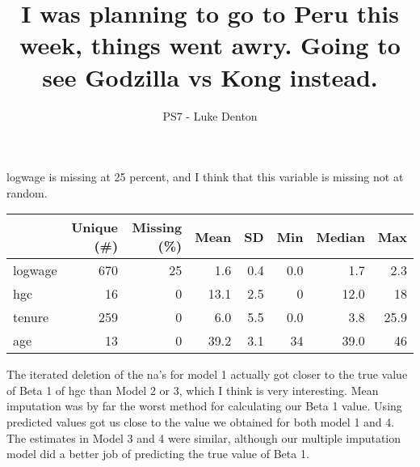 \documentclass{homework}
\title{I was planning to go to Peru this week, things went awry. Going to see Godzilla vs Kong instead.}
\author{PS7 - Luke Denton}
\begin{document}
\maketitle

\exercise
logwage is missing at 25 percent, and I think that this variable is missing not at random.
\begin{table}[h]
\centering
\begin{tabular}[t]{lrrrrrrr}
\toprule
  & Unique (\#) & Missing (\%) & Mean & SD & Min & Median & Max\\
\midrule
logwage & 670 & 25 & 1.6 & 0.4 & 0.0 & 1.7 & 2.3\\
hgc & 16 & 0 & 13.1 & 2.5 & 0 & 12.0 & 18\\
tenure & 259 & 0 & 6.0 & 5.5 & 0.0 & 3.8 & 25.9\\
age & 13 & 0 & 39.2 & 3.1 & 34 & 39.0 & 46\\
\bottomrule
\end{tabular}
\end{table}

\exercise
The iterated deletion of the na's for model 1 actually got closer to the true value of Beta 1 of hgc than Model 2 or 3, which I think is very interesting. Mean imputation was by far the worst method for calculating our Beta 1 value. Using predicted values got us close to the value we obtained for both model 1 and 4. The estimates in Model 3 and 4 were similar, although our multiple imputation model did a better job of predicting the true value of Beta 1. 
\end{document}
